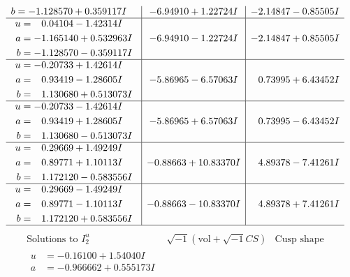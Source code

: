 \documentclass[1p]{elsarticle_modified}
\theoremstyle{definition}
\newcommand{\I}{\sqrt{-1}}
\begin{document}
$$\begin{array}{c|c|c}
\begin{aligned}
b &= -1.128570 + 0.359117 I\end{aligned}
 & -6.94910 + 1.22724 I & -2.14847 - 0.85505 I \\ \hline\begin{aligned}
u &= \phantom{-}0.04104 - 1.42314 I \\
a &= -1.165140 + 0.532963 I \\
b &= -1.128570 - 0.359117 I\end{aligned}
 & -6.94910 - 1.22724 I & -2.14847 + 0.85505 I \\ \hline\begin{aligned}
u &= -0.20733 + 1.42614 I \\
a &= \phantom{-}0.93419 - 1.28605 I \\
b &= \phantom{-}1.130680 + 0.513073 I\end{aligned}
 & -5.86965 - 6.57063 I & \phantom{-}0.73995 + 6.43452 I \\ \hline\begin{aligned}
u &= -0.20733 - 1.42614 I \\
a &= \phantom{-}0.93419 + 1.28605 I \\
b &= \phantom{-}1.130680 - 0.513073 I\end{aligned}
 & -5.86965 + 6.57063 I & \phantom{-}0.73995 - 6.43452 I \\ \hline\begin{aligned}
u &= \phantom{-}0.29669 + 1.49249 I \\
a &= \phantom{-}0.89771 + 1.10113 I \\
b &= \phantom{-}1.172120 - 0.583556 I\end{aligned}
 & -0.88663 + 10.83370 I & \phantom{-}4.89378 - 7.41261 I \\ \hline\begin{aligned}
u &= \phantom{-}0.29669 - 1.49249 I \\
a &= \phantom{-}0.89771 - 1.10113 I \\
b &= \phantom{-}1.172120 + 0.583556 I\end{aligned}
 & -0.88663 - 10.83370 I & \phantom{-}4.89378 + 7.41261 I\\
 \hline 
 \end{array}$$\newpage$$\begin{array}{c|c|c}  
\text{Solutions to }I^u_{2}& \I (\text{vol} + \sqrt{-1}CS) & \text{Cusp shape}\\
 \hline 
\begin{aligned}
u &= -0.16100 + 1.54040 I \\
a &= -0.966662 + 0.555173 I \\

\end{aligned}
\end{array}$$
\end{document}
